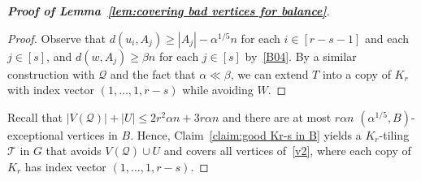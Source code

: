 \documentclass[11pt, a4paper]{article}
\theoremstyle{definition}
\newcommand{\<}{\subseteq}
\begin{document}
\begin{proof}[{\bf Proof of Lemma~\ref{lem:covering bad vertices for balance}}]
\begin{proof}
Observe that $d(u_i,A_j)\geq |A_j|-\alpha^{1/5}n$ for each $i\in [r-s-1]$ and each $j\in [s]$, and $d(w,A_j)\geq \beta n$ for each $j\in [s]$ by~\ref{B04}. By a similar construction with $\mathcal{Q}$ and the fact that $\alpha\ll \beta$, we can extend \( T\) into a copy of \( K_r \) with index vector $(1,\ldots,1,r-s)$ while avoiding $W$. %
\end{proof}

{Recall that $|V(\mathcal{Q})|+|U|\leq 2r^2\alpha n+3r\alpha n$ and there are at most $r\alpha n$ $(\alpha^{1/5},B)$-exceptional vertices in $B$.  Hence, Claim~\ref{claim:good Kr-s in B} yields a $K_r$-tiling $\mathcal{T}$ in $G$ that avoids $V(\mathcal{Q})\cup U$ and covers all vertices of~\ref{v2}, where each copy of $K_r$ has index vector $(1,\ldots,1,r-s)$.} %

\end{proof}
\end{document}
